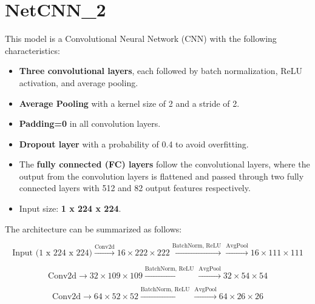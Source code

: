 \documentclass[12pt]{article}
\begin{document}



\section*{NetCNN\_2}
This model is a Convolutional Neural Network (CNN) with the following characteristics:
\begin{itemize}
    \item \textbf{Three convolutional layers}, each followed by batch normalization, ReLU activation, and average pooling.
    \item \textbf{Average Pooling} with a kernel size of 2 and a stride of 2.
    \item \textbf{Padding=0} in all convolution layers.
    \item \textbf{Dropout layer} with a probability of 0.4 to avoid overfitting.
    \item The \textbf{fully connected (FC) layers} follow the convolutional layers, where the output from the convolution layers is flattened and passed through two fully connected layers with 512 and 82 output features respectively.
    \item Input size: \textbf{1 x 224 x 224}.
\end{itemize}

The architecture can be summarized as follows:

\[
\text{Input (1 x 224 x 224)} \xrightarrow{\text{Conv2d}} 16 \times 222 \times 222 \xrightarrow{\text{BatchNorm, ReLU}} \xrightarrow{\text{AvgPool}} 16 \times 111 \times 111
\]

\[
\text{Conv2d} \rightarrow 32 \times 109 \times 109 \xrightarrow{\text{BatchNorm, ReLU}} \xrightarrow{\text{AvgPool}} 32 \times 54 \times 54
\]

\[
\text{Conv2d} \rightarrow 64 \times 52 \times 52 \xrightarrow{\text{BatchNorm, ReLU}} \xrightarrow{\text{AvgPool}} 64 \times 26 \times 26
\]
\end{document}

